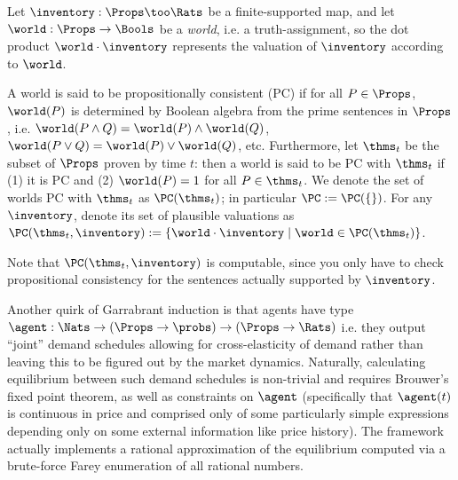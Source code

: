 \begin{subappendices}
\begin{definition}
    Let $\inventory:\Props\too\Rats$ be a finite-supported map, and let $\world:\Props\to\Bools$ be a \emph{world}, i.e. a truth-assignment, so the dot product $\world\cdot\inventory$ represents the valuation of $\inventory$ according to $\world$.
\end{definition}

\begin{definition}[PC worlds]
     A world is said to be propositionally consistent (PC) if for all $P\in\Props$, $\world(P)$ is determined by Boolean algebra from the prime sentences in $\Props$, i.e. $\world(P\land Q)=\world(P)\land \world(Q)$, $\world(P\lor Q)=\world(P)\lor \world(Q)$, etc. Furthermore, let $\thms_t$ be the subset of $\Props$ proven by time $t$: then a world is said to be PC with $\thms_t$ if (1) it is PC and (2) $\world(P)=1$ for all $P\in\thms_t$. We denote the set of worlds PC with $\thms_t$ as $\PC(\thms_t)$; in particular $\PC:=\PC(\{\})$. For any $\inventory$, denote its set of plausible valuations as $\PC(\thms_t,\inventory):=\{\world\cdot\inventory\mid \world\in\PC(\thms_t)\}$.
\end{definition}

Note that $\PC(\thms_t,\inventory)$ is computable, since you only have to check propositional consistency for the sentences actually supported by $\inventory$.

Another quirk of Garrabrant induction is that agents have type $\agent:\Nats\to(\Props\to\probs)\to(\Props\to\Rats)$ i.e. they output ``joint'' demand schedules allowing for cross-elasticity of demand rather than leaving this to be figured out by the market dynamics. Naturally, calculating equilibrium between such demand schedules is non-trivial and requires Brouwer's fixed point theorem, as well as constraints on $\agent$ (specifically that $\agent(t)$ is continuous in price and comprised only of some particularly simple expressions depending only on some external information like price history). The framework actually implements a rational approximation of the equilibrium computed via a brute-force Farey enumeration of all rational numbers.


\end{subappendices}
